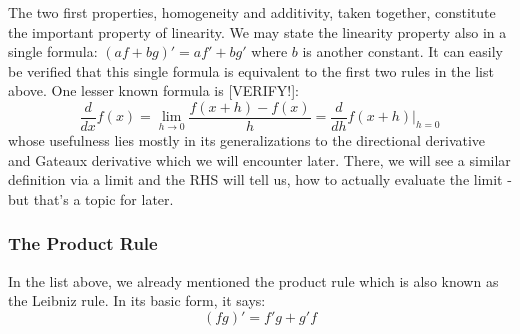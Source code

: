 The two first properties, homogeneity and additivity, taken together, constitute the important property of linearity. We may state the linearity property also in a single formula: $(a f + b g)' = a f' + b g'$ where $b$ is another constant. It can easily be verified that this single formula is equivalent to the first two rules in the list above. One lesser known formula is [VERIFY!]:
\begin{equation}
\label{Eq:DerivativeViaH}
 \frac{d}{d x} f(x) 
 = \lim_{h \rightarrow 0} \frac{f(x + h) - f(x)}{h}
 = \frac{d}{d h} f(x + h) \bigg\rvert_{h=0}
\end{equation}
whose usefulness lies mostly in its generalizations to the directional derivative and Gateaux derivative which we will encounter later. There, we will see a similar definition via a limit and the RHS will tell us, how to actually evaluate the limit - but that's a topic for later. 





\subsubsection{The Product Rule}
In the list above, we already mentioned the product rule which is also known as the Leibniz rule. In its basic form, it says:
\begin{equation}
 (f g)'  = f' g + g' f
\end{equation}

